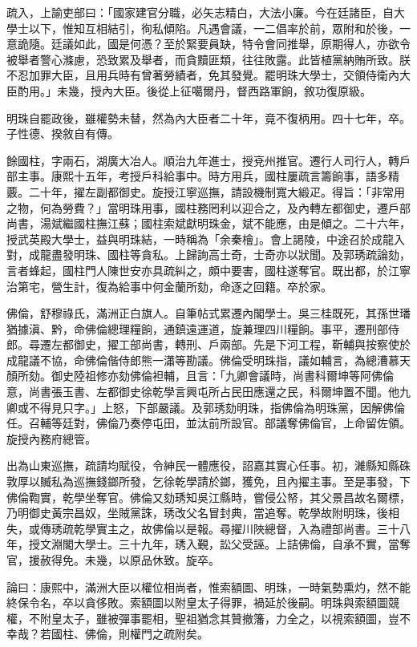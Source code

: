 \begin{pinyinscope}
疏入，上諭吏部曰：「國家建官分職，必矢志精白，大法小廉。今在廷諸臣，自大學士以下，惟知互相結引，徇私傾陷。凡遇會議，一二倡率於前，眾附和於後，一意詭隨。廷議如此，國是何憑？至於緊要員缺，特令會同推舉，原期得人，亦欲令被舉者警心滌慮，恐致累及舉者，而貪黷匪類，往往敗露。此皆植黨納賄所致。朕不忍加罪大臣，且用兵時有曾著勞績者，免其發覺。罷明珠大學士，交領侍衛內大臣酌用。」未幾，授內大臣。後從上征噶爾丹，督西路軍餉，敘功復原級。

明珠自罷政後，雖權勢未替，然為內大臣者二十年，竟不復柄用。四十七年，卒。子性德、揆敘自有傳。

餘國柱，字兩石，湖廣大冶人。順治九年進士，授兗州推官。遷行人司行人，轉戶部主事。康熙十五年，考授戶科給事中。時方用兵，國柱屢疏言籌餉事，語多精覈。二十年，擢左副都御史。旋授江寧巡撫，請設機制寬大緞疋。得旨：「非常用之物，何為勞費？」當明珠用事，國柱務罔利以迎合之，及內轉左都御史，遷戶部尚書，湯斌繼國柱撫江蘇；國柱索斌獻明珠金，斌不能應，由是傾之。二十六年，授武英殿大學士，益與明珠結，一時稱為「余秦檜」。會上謁陵，中途召於成龍入對，成龍盡發明珠、國柱等貪私。上歸詢高士奇，士奇亦以狀聞。及郭琇疏論劾，言者蜂起，國柱門人陳世安亦具疏糾之，頗中要害，國柱遂奪官。既出都，於江寧治第宅，營生計，復為給事中何金蘭所劾，命逐之回籍。卒於家。

佛倫，舒穆祿氏，滿洲正白旗人。自筆帖式累遷內閣學士。吳三桂既死，其孫世璠猶據滇、黔，命佛倫總理糧餉，通鎮遠運道，旋兼理四川糧餉。事平，遷刑部侍郎。尋遷左都御史，擢工部尚書，轉刑、戶兩部。先是下河工程，靳輔與按察使於成龍議不協，命佛倫偕侍郎熊一瀟等勘議。佛倫受明珠指，議如輔言，為總漕慕天顏所劾。御史陸祖修亦劾佛倫袒輔，且言：「九卿會議時，尚書科爾坤等阿佛倫意，尚書張玉書、左都御史徐乾學言興屯所占民田應還之民，科爾坤置不聞。他九卿或不得見只字。」上怒，下部嚴議。及郭琇劾明珠，指佛倫為明珠黨，因解佛倫任。召輔等廷對，佛倫乃奏停屯田，並汰前所設官。部議奪佛倫官，上命留佐領。旋授內務府總管。

出為山東巡撫，疏請均賦役，令紳民一體應役，詔嘉其實心任事。初，濰縣知縣硃敦厚以贓私為巡撫錢鎯所發，乞徐乾學請於鎯，獲免，且內擢主事。至是事發，下佛倫鞫實，乾學坐奪官。佛倫又劾琇知吳江縣時，嘗侵公帑，其父景昌故名爾標，乃明御史黃宗昌奴，坐賊黨誅，琇改父名冒封典，當追奪。乾學故附明珠，後相失，或傳琇疏乾學實主之，故佛倫以是報。尋擢川陜總督，入為禮部尚書。三十八年，授文淵閣大學士。三十九年，琇入覲，訟父受誣。上詰佛倫，自承不實，當奪官，援赦得免。未幾，以原品休致。旋卒。

論曰：康熙中，滿洲大臣以權位相尚者，惟索額圖、明珠，一時氣勢熏灼，然不能終保令名，卒以貪侈敗。索額圖以附皇太子得罪，禍延於後嗣。明珠與索額圖競權，不附皇太子，雖被彈事罷相，聖祖猶念其贊撤籓，力全之，以視索額圖，豈不幸哉？若國柱、佛倫，則權門之疏附矣。


\end{pinyinscope}